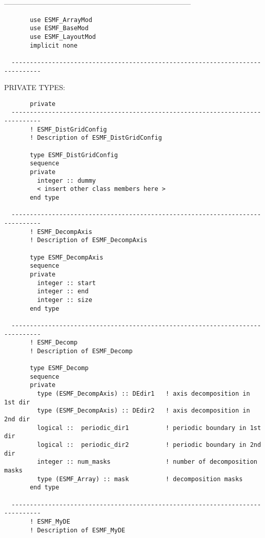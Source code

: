   ------------------------------------------------------------------------------
\begin{verbatim}       use ESMF_ArrayMod
       use ESMF_BaseMod
       use ESMF_LayoutMod
       implicit none
 
  ------------------------------------------------------------------------------\end{verbatim}{\sf PRIVATE TYPES:}
\begin{verbatim}       private
  ------------------------------------------------------------------------------
       ! ESMF_DistGridConfig
       ! Description of ESMF_DistGridConfig
 
       type ESMF_DistGridConfig
       sequence
       private
         integer :: dummy
         < insert other class members here >
       end type
 
  ------------------------------------------------------------------------------
       ! ESMF_DecompAxis
       ! Description of ESMF_DecompAxis
 
       type ESMF_DecompAxis
       sequence
       private
         integer :: start
         integer :: end
         integer :: size
       end type
 
  ------------------------------------------------------------------------------
       ! ESMF_Decomp
       ! Description of ESMF_Decomp
 
       type ESMF_Decomp
       sequence
       private
         type (ESMF_DecompAxis) :: DEdir1   ! axis decomposition in 1st dir
         type (ESMF_DecompAxis) :: DEdir2   ! axis decomposition in 2nd dir
         logical ::  periodic_dir1          ! periodic boundary in 1st dir
         logical ::  periodic_dir2          ! periodic boundary in 2nd dir
         integer :: num_masks               ! number of decomposition masks
         type (ESMF_Array) :: mask          ! decomposition masks
       end type
 
  ------------------------------------------------------------------------------
       ! ESMF_MyDE
       ! Description of ESMF_MyDE
 

\end{verbatim}

